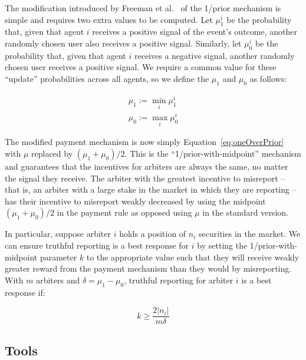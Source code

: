 The modification introduced by Freeman et al.~\cite{Freeman2017} of the 1/prior
mechanism is simple and requires two extra values to be computed. Let $\mu_1^i$
be the probability that, given that agent $i$ receives a positive signal of the
event's outcome, another randomly chosen user also receives a positive signal.
Similarly, let $\mu_0^i$ be the probability that, given that agent $i$ receives
a negative signal, another randomly chosen user receives a positive signal. We
require a common value for these ``update'' probabilities across all agents, so
we define the $\mu_1$ and $\mu_0$ as follows:

\begin{equation}
	\begin{gathered}
		\mu_1 := \min_i \mu_1^i \\
		\mu_0 := \max_i \mu_0^i
	\end{gathered}
\end{equation}

The modified payment mechanism is now simply Equation~\ref{eq:oneOverPrior}
with $\mu$ replaced by $(\mu_1 + \mu_0)/2$. This is the
``1/prior-with-midpoint'' mechanism and guarantees that the incentives for
arbiters are always the same, no matter the signal they receive. The arbiter
with the greatest incentive to misreport -- that is, an arbiter with a large
stake in the market in which they are reporting -- has their incentive to
misreport weakly decreased by using the midpoint $(\mu_1 + \mu_0)/2$ in the
payment rule as opposed using $\mu$ in the standard version.

In particular, suppose arbiter $i$ holds a position of $n_i$ securities in the
market. We can ensure truthful reporting is a best response for $i$ by setting
the 1/prior-with-midpoint parameter $k$ to the appropriate value such that they
will receive weakly greater reward from the payment mechanism than they would
by misreporting. With $m$ arbiters and $\delta = \mu_1 - \mu_0$, truthful
reporting for arbiter $i$ is a best response if:

\begin{equation}
	\label{eq:kParameter}
	k \ge \frac{2 |n_i|}{m \delta}
\end{equation}

\subsection{Tools}

